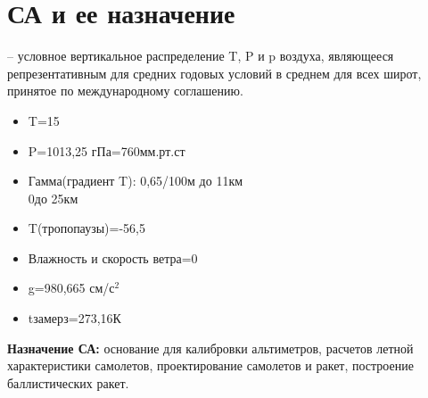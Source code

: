 
\section{СА и ее назначение}
 – условное вертикальное распределение T, P и p воздуха, являющееся репрезентативным для средних годовых условий в среднем для всех широт, принятое по международному соглашению.
\begin{itemize}
	\item[]  T=15\celsius
	\item[]  P=1013,25 гПа=760мм.рт.ст
	\item[]  Гамма(градиент T):	0,65\celsius/100м до 11км\\
	{\hspace*{2,1cm} 0\celsius до 25км}
	
	\item[] T(тропопаузы)=-56,5 \celsius
	\item[] Влажность и скорость ветра=0
	\item[] g=980,665 см/с$^2$
	\item[] tзамерз=273,16К
\end{itemize}
\textbf{ Назначение СА:} основание для калибровки альтиметров, расчетов летной характеристики самолетов, проектирование самолетов и ракет, построение баллистических ракет.